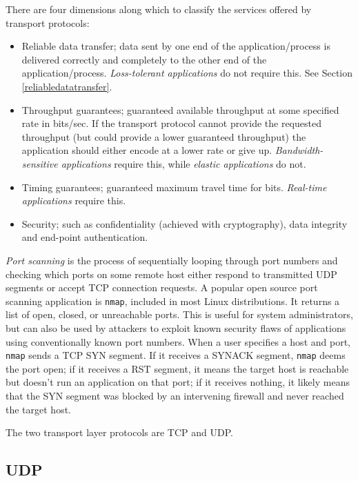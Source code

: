 \documentclass[table, xcdraw]{article}%
\begin{document}
There are four dimensions along which to classify the services offered by transport protocols:

\begin{itemize}
    \item Reliable data transfer; data sent by one end of the application/process is delivered correctly and completely to the other end of the application/process. \emph{Loss-tolerant applications} do not require this. See Section \ref{reliabledatatransfer}.
    \item Throughput guarantees; guaranteed available throughput at some specified rate in bits/sec. If the transport protocol cannot provide the requested throughput (but could provide a lower guaranteed throughput) the application should either encode at a lower rate or give up. \emph{Bandwidth-sensitive applications} require this, while \emph{elastic applications} do not.
    \item Timing guarantees; guaranteed maximum travel time for bits. \emph{Real-time applications} require this.
    \item Security; such as confidentiality (achieved with cryptography), data integrity and end-point authentication.
\end{itemize}

\emph{Port scanning} is the process of sequentially looping through port numbers and checking which ports on some remote host either respond to transmitted UDP segments or accept TCP connection requests. A popular open source port scanning application is \texttt{nmap}, included in most Linux distributions. It returns a list of open, closed, or unreachable ports. This is useful for system administrators, but can also be used by attackers to exploit known security flaws of applications using conventionally known port numbers. When a user specifies a host and port, \texttt{nmap} sends a TCP SYN segment. If it receives a SYNACK segment, \texttt{nmap} deems the port open; if it receives a RST segment, it means the target host is reachable but doesn't run an application on that port; if it receives nothing, it likely means that the SYN segment was blocked by an intervening firewall and never reached the target host.
 
The two transport layer protocols are TCP and UDP.

\subsection{UDP}
\end{document}

